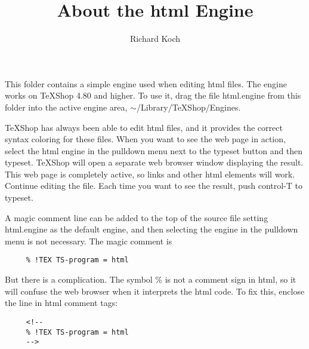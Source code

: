 \documentclass[11pt, oneside]{article}   	%
\title{About the html Engine}
\author{Richard Koch}
\begin{document}
\maketitle
This folder contains a simple engine used when editing html files. The engine works on TeXShop 4.80 and higher. To use it,
drag the file html.engine from this folder into the active engine area, $\sim$/Library/TeXShop/Engines.

TeXShop has always been able to edit html files, and it provides the correct syntax coloring for these files. When you want to see the web page in action, select the html engine in the pulldown menu next to the typeset button and then typeset. TeXShop will open a separate web browser window displaying the result. This web page is completely active, so links and other html elements will work. Continue editing the file. Each time you want to see the result, push control-T to typeset.

A magic comment line can be added to the top of the source file setting html.engine as the default engine, and then selecting the engine in the pulldown menu is not necessary. The magic comment is
\begin{verbatim}
     % !TEX TS-program = html
\end{verbatim}
But there is a complication. The symbol \% is not a comment sign in html, so it will confuse the web browser when it interprets the html code. To fix this, enclose the line in html comment tags:
\begin{verbatim}
     <!--
     % !TEX TS-program = html
     -->
\end{verbatim}
\end{document}
